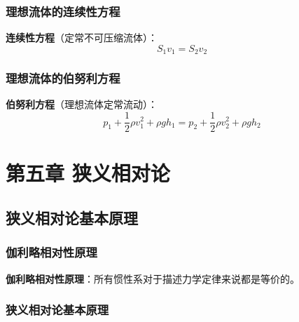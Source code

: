     \subsection{理想流体的连续性方程}
    \textbf{连续性方程}（定常不可压缩流体）：
    \[
    S_1 v_1 = S_2 v_2
    \]
    \subsection{理想流体的伯努利方程}
    \textbf{伯努利方程}（理想流体定常流动）：
    \[
    p_1+\frac{1}{2}\rho v_1^2+\rho g h_1 = p_2+\frac{1}{2}\rho v_2^2+\rho g h_2
    \]

\chapter{第五章 狭义相对论}

\section{狭义相对论基本原理}
    \subsection{伽利略相对性原理}
    \textbf{伽利略相对性原理}：所有惯性系对于描述力学定律来说都是等价的。

    \subsection{狭义相对论基本原理}
